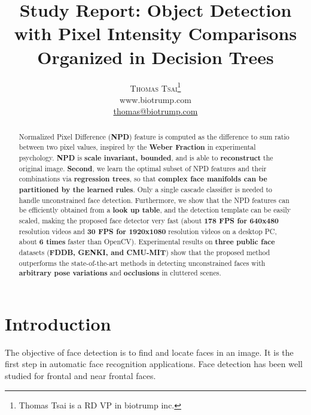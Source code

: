 \documentclass[a4paper,12pt]{article}
\title{\vspace{-15mm}\fontsize{24pt}{10pt}\selectfont\textbf{Study Report: Object Detection with Pixel Intensity Comparisons Organized in Decision Trees}} %
\author{
\large
\textsc{Thomas Tsai}\thanks{Thomas Tsai is a RD VP in biotrump inc.}\\[2mm] %
\normalsize www.biotrump.com \\ %
\normalsize \href{mailto:thomas@biotrump.com}{thomas@biotrump.com} %
\vspace{-5mm}
}
\date{}
\begin{document}
\maketitle %


\begin{abstract}

Normalized Pixel Difference (\textbf{NPD}) feature is computed as the difference 
to sum ratio between two pixel values, inspired by the \textbf{Weber Fraction} in
experimental psychology. \textbf{NPD} is \textbf{scale invariant, bounded}, 
and is able to \textbf{reconstruct} the original image. \textbf{Second}, we learn 
the optimal subset of NPD features and their combinations via \textbf{regression trees}, 
so that \textbf{complex face manifolds can be partitioned by the learned rules}. 
Only a single cascade classifier is needed to handle unconstrained face detection.
Furthermore, we show that the NPD features can be efficiently obtained from a \textbf{look up table}, 
and the detection template can be easily scaled, making the proposed face detector very fast 
(about \textbf{178 FPS for 640x480} resolution videos and \textbf{30 FPS for 1920x1080} 
resolution videos on a desktop PC, about \textbf{6 times} faster than OpenCV). 
Experimental results on \textbf{three public face} datasets (\textbf{FDDB, GENKI, and CMU-MIT}) 
show that the proposed method outperforms the state-of-the-art methods in detecting unconstrained 
faces with \textbf{arbitrary pose variations} and \textbf{occlusions} in cluttered scenes.
\cite{DBLP:journals/corr/LiaoJL14}
\end{abstract}




\section{Introduction}
The objective of face detection is to find and locate faces in an image. It is the first step in automatic face
recognition applications. Face detection has been well studied for frontal and near frontal faces.
\end{document}
